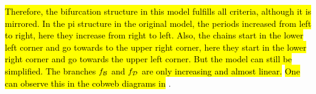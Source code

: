 \hl{
	Therefore, the bifurcation structure in this model fulfills all criteria, although it is mirrored.
	In the \gls{pi} structure in the original model, the periods increased from left to right, here they increase from right to left.
	Also, the chains start in the lower left corner and go towards to the upper right corner, here they start in the lower right corner and go towards the upper left corner.
	But the model can still be simplified.
	The branches $f_{\mathcal{B}}$ and $f_{\mathcal{D}}$ are only increasing and almost linear.
}
\hl{One can observe this in the cobweb diagrams in} .
